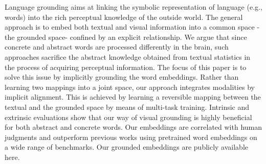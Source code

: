 Language grounding aims at linking the symbolic representation of language (e.g., words) into the rich perceptual knowledge of the outside world.  The general approach is to embed both textual and visual information into a common space -the grounded space- confined by an explicit relationship. We argue that since concrete and abstract words are processed differently in the brain, such approaches sacrifice the abstract knowledge obtained from textual statistics in the process of acquiring perceptual information. The focus of this paper is to solve this issue by implicitly grounding the word embeddings. Rather than learning two mappings into a joint space, our approach integrates modalities by implicit alignment. This is achieved by learning a reversible mapping between the textual and the grounded space by means of multi-task training. Intrinsic and extrinsic evaluations show that our way of visual grounding is highly beneficial for both abstract and concrete words. Our embeddings are correlated with human judgments and outperform previous works using pretrained word embeddings on a wide range of benchmarks. Our grounded embeddings are publicly available here.
